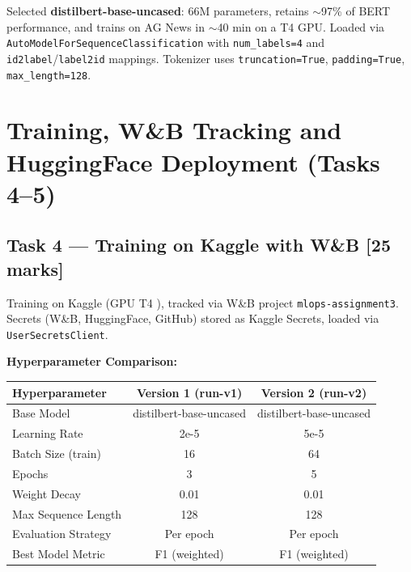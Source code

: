 \documentclass[11pt,a4paper]{article}
\begin{document}
Selected \textbf{distilbert-base-uncased}: 66M parameters, retains $\sim$97\% of BERT performance, and trains on AG News in $\sim$40 min on a T4 GPU. Loaded via \texttt{AutoModelForSequenceClassification} with \texttt{num\_labels=4} and \texttt{id2label}/\texttt{label2id} mappings. Tokenizer uses \texttt{truncation=True}, \texttt{padding=True}, \texttt{max\_length=128}.

\section{Training, W\&B Tracking and HuggingFace Deployment (Tasks 4--5)}

\subsection{Task 4 --- Training on Kaggle with W\&B [25 marks]}

Training on Kaggle (GPU T4 ), tracked via W\&B project \texttt{mlops-assignment3}. Secrets (W\&B, HuggingFace, GitHub) stored as Kaggle Secrets, loaded via \texttt{UserSecretsClient}.

\vspace{0.3cm}
\textbf{Hyperparameter Comparison:}

\renewcommand{\arraystretch}{1.4}
\begin{tabular}{lcc}
\toprule
\textbf{Hyperparameter}   & \textbf{Version 1 (run-v1)} & \textbf{Version 2 (run-v2)} \\
\midrule
Base Model                & distilbert-base-uncased     & distilbert-base-uncased \\
Learning Rate             & 2e-5                        & 5e-5                    \\
Batch Size (train)        & 16                          & 64                      \\
Epochs                    & 3                           & 5                       \\
Weight Decay              & 0.01                        & 0.01                    \\
Max Sequence Length       & 128                         & 128                     \\
Evaluation Strategy       & Per epoch                   & Per epoch               \\
Best Model Metric         & F1 (weighted)               & F1 (weighted)           \\
\bottomrule
\end{tabular}
\end{document}
